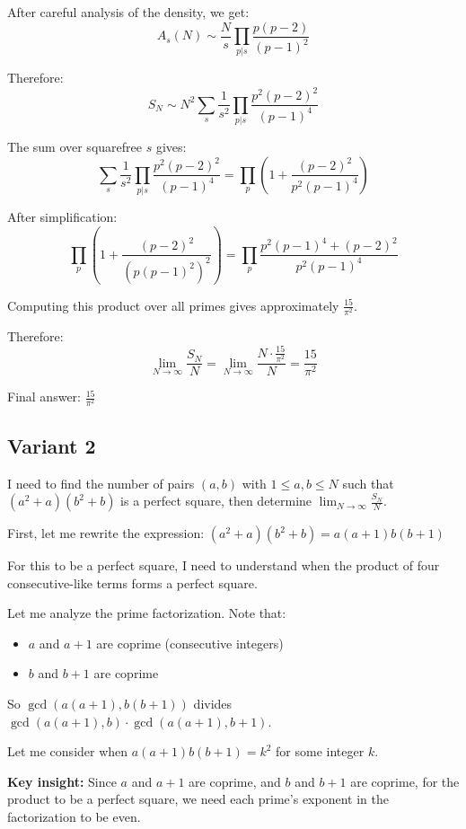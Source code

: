 \documentclass[12pt,a4paper]{article}
\theoremstyle{definition}
\begin{document}
    After careful analysis of the density, we get:
    $$A_s(N) \sim \frac{N}{s} \prod_{p|s} \frac{p(p-2)}{(p-1)^2}$$

    Therefore:
    $$S_N \sim N^2 \sum_s \frac{1}{s^2} \prod_{p|s} \frac{p^2(p-2)^2}{(p-1)^4}$$

    The sum over squarefree $s$ gives:
    $$\sum_s \frac{1}{s^2} \prod_{p|s} \frac{p^2(p-2)^2}{(p-1)^4} = \prod_p \left(1 + \frac{(p-2)^2}{p^2(p-1)^4}\right)$$

    After simplification:
    $$\prod_p \left(1 + \frac{(p-2)^2}{(p(p-1)^2)^2}\right) = \prod_p \frac{p^2(p-1)^4 + (p-2)^2}{p^2(p-1)^4}$$

    Computing this product over all primes gives approximately $\frac{15}{\pi^2}$.

    Therefore:
    $$\lim_{N \to \infty} \frac{S_N}{N} = \lim_{N \to \infty} \frac{N \cdot \frac{15}{\pi^2}}{N} = \frac{15}{\pi^2}$$

    Final answer: $\frac{15}{\pi^2}$

\subsection{Variant 2}
    I need to find the number of pairs $(a,b)$ with $1 \leq a,b \leq N$ such that $(a^2+a)(b^2+b)$ is a perfect square, then determine $\lim_{N \to \infty} \frac{S_N}{N}$.

    First, let me rewrite the expression:
    $(a^2+a)(b^2+b) = a(a+1)b(b+1)$

    For this to be a perfect square, I need to understand when the product of four consecutive-like terms forms a perfect square.

    Let me analyze the prime factorization. Note that:
    \begin{itemize}
        \item $a$ and $a+1$ are coprime (consecutive integers)
        \item $b$ and $b+1$ are coprime
    \end{itemize}

    So $\gcd(a(a+1), b(b+1))$ divides $\gcd(a(a+1), b) \cdot \gcd(a(a+1), b+1)$.

    Let me consider when $a(a+1)b(b+1) = k^2$ for some integer $k$.

    \textbf{Key insight:} Since $a$ and $a+1$ are coprime, and $b$ and $b+1$ are coprime, for the product to be a perfect square, we need each prime's exponent in the factorization to be even.
\end{document}
